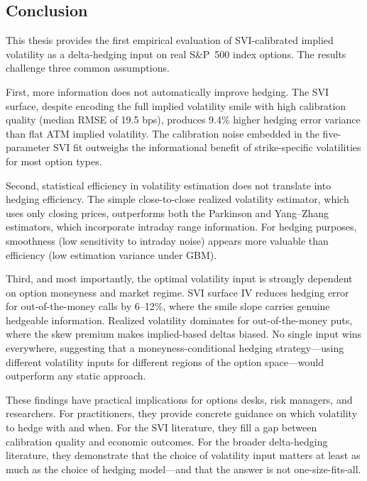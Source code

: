 \documentclass[12pt, letterpaper]{article}
\begin{document}
\subsection{Conclusion}

This thesis provides the first empirical evaluation of SVI-calibrated implied volatility as a delta-hedging input on real S\&P~500 index options. The results challenge three common assumptions.

First, more information does not automatically improve hedging. The SVI surface, despite encoding the full implied volatility smile with high calibration quality (median RMSE of 19.5 bps), produces 9.4\% higher hedging error variance than flat ATM implied volatility. The calibration noise embedded in the five-parameter SVI fit outweighs the informational benefit of strike-specific volatilities for most option types.

Second, statistical efficiency in volatility estimation does not translate into hedging efficiency. The simple close-to-close realized volatility estimator, which uses only closing prices, outperforms both the Parkinson and Yang--Zhang estimators, which incorporate intraday range information. For hedging purposes, smoothness (low sensitivity to intraday noise) appears more valuable than efficiency (low estimation variance under GBM).

Third, and most importantly, the optimal volatility input is strongly dependent on option moneyness and market regime. SVI surface IV reduces hedging error for out-of-the-money calls by 6--12\%, where the smile slope carries genuine hedgeable information. Realized volatility dominates for out-of-the-money puts, where the skew premium makes implied-based deltas biased. No single input wins everywhere, suggesting that a moneyness-conditional hedging strategy---using different volatility inputs for different regions of the option space---would outperform any static approach.

These findings have practical implications for options desks, risk managers, and researchers. For practitioners, they provide concrete guidance on which volatility to hedge with and when. For the SVI literature, they fill a gap between calibration quality and economic outcomes. For the broader delta-hedging literature, they demonstrate that the choice of volatility input matters at least as much as the choice of hedging model---and that the answer is not one-size-fits-all.


\newpage

\end{document}
